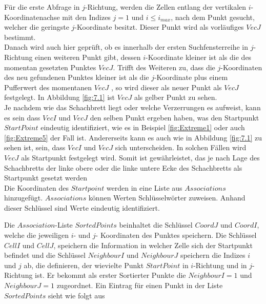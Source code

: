 

Für die erste Abfrage in $j$-Richtung, werden die Zellen entlang der vertikalen $i$-Koordinatenachse mit den Indizes $j=1$ und $i \leq i_{max}$, nach dem Punkt gesucht, welcher die geringste $j$-Koordinate besitzt. Dieser Punkt wird als vorläufiges $VecJ$ bestimmt.\\

Danach wird auch hier geprüft, ob es innerhalb der ersten Suchfensterreihe in $j$-Richtung einen weiteren Punkt gibt, dessen $i$-Koordinate kleiner ist als die des momentan gesetzten Punktes $VecJ$. Trifft des Weiteren zu, dass die $j$-Koordinaten des neu gefundenen Punktes kleiner ist als die $j$-Koordinate plus einem Pufferwert des momentanen $VecJ$ , so wird dieser als neuer Punkt als $VecJ$ festgelegt. In Abbildung \ref{fig:7.1} ist $VecJ$ als gelber Punkt zu sehen.\\

Je nachdem wie das Schachbrett liegt oder welche Verzerrungen es aufweist, kann es sein dass $VecI$ und $VecJ$ den selben Punkt ergeben haben, was den Startpunkt $StartPoint$ eindeutig identifiziert, wie es in Beispiel \ref{fig:Extreme1} oder auch \ref{fig:Extreme5} der Fall ist. Andererseits kann es auch wie in Abbildung \ref{fig:7.1} zu sehen ist, sein, dass $VecI$ und $VecJ$ sich unterscheiden. In solchen Fällen wird $VecJ$ als Startpunkt festgelegt wird. Somit ist gewährleistet, das je nach Lage des Schachbretts der linke obere oder die linke untere Ecke des Schachbretts als Startpunkt gesetzt werden\\

Die Koordinaten des $Startpoint$ werden in eine Liste aus $Associations$ \cite{Mathematica} hinzugefügt. $Associations$ können Werten Schlüsselwörter zuweisen. Anhand dieser Schlüssel sind Werte eindeutig identifiziert. 

Die $Association$-Liste $SortedPoints$ beinhaltet die Schlüssel $CoordJ$ und $CoordI$, welche die jeweiligen $i$- und $j$- Koordinaten des Punktes speichern. Die Schlüssel $CellI$ und $CellJ$, speichern die Information in welcher Zelle sich der Startpunkt befindet und die Schlüssel $NeighbourI$ und $NeighbourJ$ speichern die Indizes $i$ und $j$ ab, die definieren, der wievielte Punkt $StartPoint$ in $i$-Richtung und in $j$-Richtung ist. Er bekommt als erster Sortierter Punkte die $NeighbourI = 1$ und $NeighbourJ = 1$ zugeordnet. Ein Eintrag für einen Punkt in der Liste $SortedPoints$ sieht wie folgt aus \\

